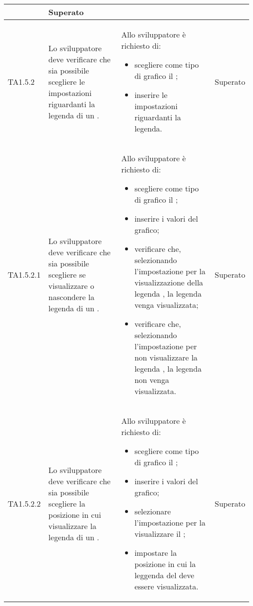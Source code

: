 \begin{longtabu}{| X[0.5] | X | X | X[0.5] |}
\begin{itemize}
		\end{itemize}
& Superato \\ \hline

	TA1.5.2 & Lo sviluppatore deve verificare che sia possibile scegliere le impostazioni riguardanti la legenda di un .

		& Allo sviluppatore è richiesto di:
		\begin{itemize}
			\item scegliere come tipo di grafico il ;
			\item inserire le impostazioni riguardanti la legenda.
		\end{itemize}
& Superato \\ \hline

	TA1.5.2.1 & Lo sviluppatore deve verificare che sia possibile scegliere se visualizzare o nascondere la legenda di un .
		
		& Allo sviluppatore è richiesto di:
		\begin{itemize}
			\item scegliere come tipo di grafico il ;
			\item inserire i valori del grafico;
			\item verificare che, selezionando l'impostazione per la visualizzazione della legenda , la legenda venga visualizzata;
			\item verificare che, selezionando l'impostazione per non visualizzare la legenda , la legenda non venga visualizzata.
		\end{itemize}
& Superato \\ \hline

	TA1.5.2.2 & Lo sviluppatore deve verificare che sia possibile scegliere la posizione in cui visualizzare la legenda di un .
			
		& Allo sviluppatore è richiesto di:
		\begin{itemize}
			\item scegliere come tipo di grafico il ;
			\item inserire i valori del grafico;
			\item selezionare l'impostazione per la visualizzare il ;
			\item impostare la posizione in cui la leggenda del  deve essere visualizzata.
		\end{itemize}
& Superato \\ \hline


\end{longtabu}
